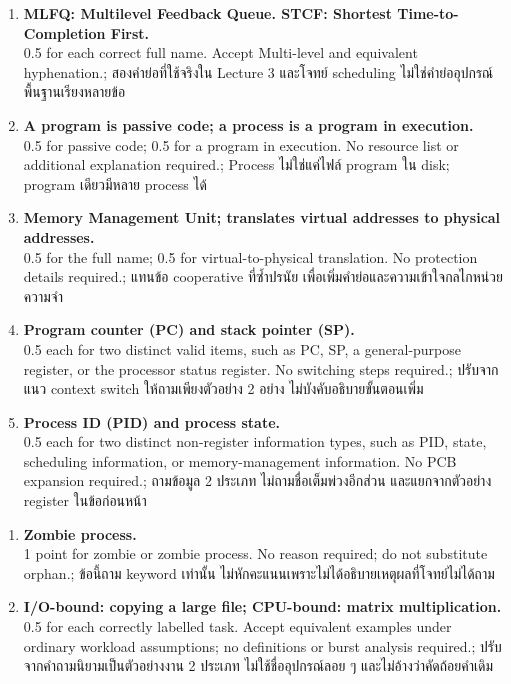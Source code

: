 \begin{enumerate}[leftmargin=1.4em,itemsep=.25cm]
\item \textbf{MLFQ: Multilevel Feedback Queue. STCF: Shortest Time-to-Completion First.}\\0.5 for each correct full name. Accept Multi-level and equivalent hyphenation.; สองคำย่อที่ใช้จริงใน Lecture 3 และโจทย์ scheduling ไม่ใช่คำย่ออุปกรณ์พื้นฐานเรียงหลายข้อ
\item \textbf{A program is passive code; a process is a program in execution.}\\0.5 for passive code; 0.5 for a program in execution. No resource list or additional explanation required.; Process ไม่ใช่แค่ไฟล์ program ใน disk; program เดียวมีหลาย process ได้
\item \textbf{Memory Management Unit; translates virtual addresses to physical addresses.}\\0.5 for the full name; 0.5 for virtual-to-physical translation. No protection details required.; แทนข้อ cooperative ที่ซ้ำปรนัย เพื่อเพิ่มคำย่อและความเข้าใจกลไกหน่วยความจำ
\item \textbf{Program counter (PC) and stack pointer (SP).}\\0.5 each for two distinct valid items, such as PC, SP, a general-purpose register, or the processor status register. No switching steps required.; ปรับจากแนว context switch ให้ถามเพียงตัวอย่าง 2 อย่าง ไม่บังคับอธิบายขั้นตอนเพิ่ม
\item \textbf{Process ID (PID) and process state.}\\0.5 each for two distinct non-register information types, such as PID, state, scheduling information, or memory-management information. No PCB expansion required.; ถามข้อมูล 2 ประเภท ไม่ถามชื่อเต็มพ่วงอีกส่วน และแยกจากตัวอย่าง register ในข้อก่อนหน้า
\end{enumerate}\newpage{}\begin{enumerate}[leftmargin=1.4em,start=6,itemsep=.25cm]
\item \textbf{Zombie process.}\\1 point for zombie or zombie process. No reason required; do not substitute orphan.; ข้อนี้ถาม keyword เท่านั้น ไม่หักคะแนนเพราะไม่ได้อธิบายเหตุผลที่โจทย์ไม่ได้ถาม
\item \textbf{I/O-bound: copying a large file; CPU-bound: matrix multiplication.}\\0.5 for each correctly labelled task. Accept equivalent examples under ordinary workload assumptions; no definitions or burst analysis required.; ปรับจากคำถามนิยามเป็นตัวอย่างงาน 2 ประเภท ไม่ใช้ชื่ออุปกรณ์ลอย ๆ และไม่อ้างว่าคัดถ้อยคำเดิม

\end{enumerate}
